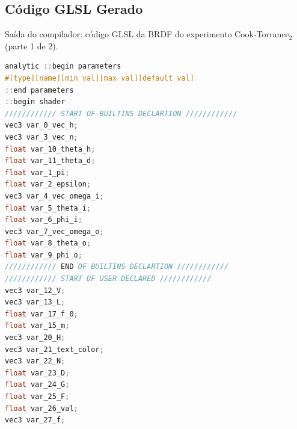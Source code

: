 \subsection{Código GLSL Gerado}
\begin{codigo}[H]
    \caption{\small Saída do compilador: código GLSL da BRDF do experimento Cook-Torrance$_2$ (parte 1 de 2).}
    \label{cod-cook-torrance-alternative-glsl-pt-1}
\begin{lstlisting}[language=C, inputencoding=utf8]
analytic ::begin parameters
#[type][name][min val][max val][default val]
::end parameters
::begin shader
//////////// START OF BUILTINS DECLARTION ////////////
vec3 var_0_vec_h;
vec3 var_3_vec_n;
float var_10_theta_h;
float var_11_theta_d;
float var_1_pi;
float var_2_epsilon;
vec3 var_4_vec_omega_i;
float var_5_theta_i;
float var_6_phi_i;
vec3 var_7_vec_omega_o;
float var_8_theta_o;
float var_9_phi_o;
//////////// END OF BUILTINS DECLARTION ////////////
//////////// START OF USER DECLARED ////////////
vec3 var_12_V;
vec3 var_13_L;
float var_17_f_0;
float var_15_m;
vec3 var_20_H;
vec3 var_21_text_color;
vec3 var_22_N;
float var_23_D;
float var_24_G;
float var_25_F;
float var_26_val;
vec3 var_27_f;
\end{lstlisting}
\end{codigo}

